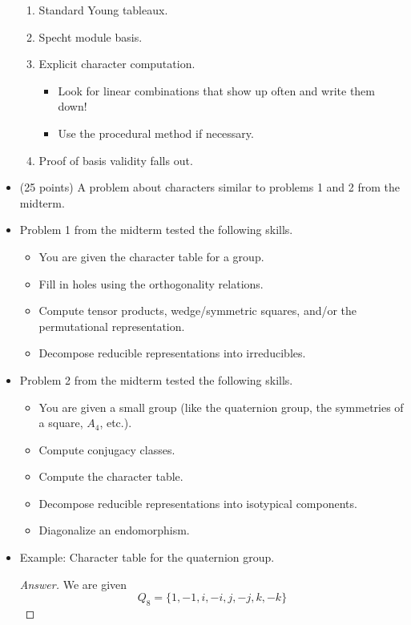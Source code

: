 \documentclass[../notes.tex]{subfiles}
\begin{document}
\begin{itemize}
\begin{enumerate}
        \item Standard Young tableaux.
        \item Specht module basis.
        \item Explicit character computation.
        \begin{itemize}
            \item Look for linear combinations that show up often and write them down!
            \item Use the procedural method if necessary.
        \end{itemize}
        \item Proof of basis validity falls out.
    \end{enumerate}
    \item (25 points) A problem about characters similar to problems 1 and 2 from the midterm.
    \item Problem 1 from the midterm tested the following skills.
    \begin{itemize}
        \item You are given the character table for a group.
        \item Fill in holes using the orthogonality relations.
        \item Compute tensor products, wedge/symmetric squares, and/or the permutational representation.
        \item Decompose reducible representations into irreducibles.
    \end{itemize}
    \item Problem 2 from the midterm tested the following skills.
    \begin{itemize}
        \item You are given a small group (like the quaternion group, the symmetries of a square, $A_4$, etc.).
        \item Compute conjugacy classes.
        \item Compute the character table.
        \item Decompose reducible representations into isotypical components.
        \item Diagonalize an endomorphism.
    \end{itemize}
    \item Example: Character table for the quaternion group.
    \begin{proof}[Answer]
        We are given
        \begin{equation*}
            Q_8 = \{1,-1,i,-i,j,-j,k,-k\}
        \end{equation*}

\end{proof}
\end{itemize}
\end{document}
